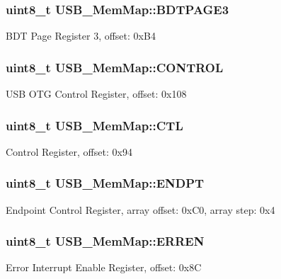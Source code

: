\subsubsection[{B\+D\+T\+P\+A\+G\+E3}]{\setlength{\rightskip}{0pt plus 5cm}uint8\+\_\+t U\+S\+B\+\_\+\+Mem\+Map\+::\+B\+D\+T\+P\+A\+G\+E3}\label{struct_u_s_b___mem_map_afd1f5b8867e36b32297641c5fe0b283b}
B\+D\+T Page Register 3, offset\+: 0x\+B4 \hypertarget{struct_u_s_b___mem_map_a98ff4d7ab9c41c673ee41053dc484447}{}
\subsubsection[{C\+O\+N\+T\+R\+O\+L}]{\setlength{\rightskip}{0pt plus 5cm}uint8\+\_\+t U\+S\+B\+\_\+\+Mem\+Map\+::\+C\+O\+N\+T\+R\+O\+L}\label{struct_u_s_b___mem_map_a98ff4d7ab9c41c673ee41053dc484447}
U\+S\+B O\+T\+G Control Register, offset\+: 0x108 \hypertarget{struct_u_s_b___mem_map_a52b35d0e8644631558a65f9b7a9b8b4b}{}
\subsubsection[{C\+T\+L}]{\setlength{\rightskip}{0pt plus 5cm}uint8\+\_\+t U\+S\+B\+\_\+\+Mem\+Map\+::\+C\+T\+L}\label{struct_u_s_b___mem_map_a52b35d0e8644631558a65f9b7a9b8b4b}
Control Register, offset\+: 0x94 \hypertarget{struct_u_s_b___mem_map_a86aaba02227a45a333f72565b0bec378}{}
\subsubsection[{E\+N\+D\+P\+T}]{\setlength{\rightskip}{0pt plus 5cm}uint8\+\_\+t U\+S\+B\+\_\+\+Mem\+Map\+::\+E\+N\+D\+P\+T}\label{struct_u_s_b___mem_map_a86aaba02227a45a333f72565b0bec378}
Endpoint Control Register, array offset\+: 0x\+C0, array step\+: 0x4 \hypertarget{struct_u_s_b___mem_map_a810f265a9ad6dc0f51834d0cecf24a79}{}
\subsubsection[{E\+R\+R\+E\+N}]{\setlength{\rightskip}{0pt plus 5cm}uint8\+\_\+t U\+S\+B\+\_\+\+Mem\+Map\+::\+E\+R\+R\+E\+N}\label{struct_u_s_b___mem_map_a810f265a9ad6dc0f51834d0cecf24a79}
Error Interrupt Enable Register, offset\+: 0x8\+C \hypertarget{struct_u_s_b___mem_map_ad86f18ee95df11168d4b6cf68578e0fa}{}
